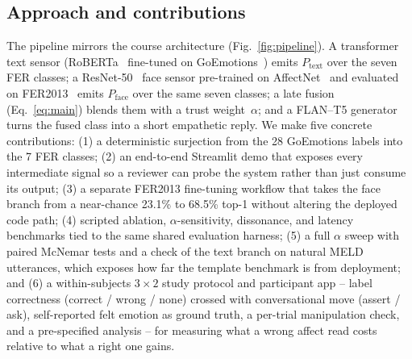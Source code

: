 \documentclass[sigconf,nonacm]{acmart}
\begin{document}
  \subsection{Approach and contributions}
  The pipeline mirrors the course architecture (Fig.~\ref{fig:pipeline}). A transformer text sensor (RoBERTa~\cite{liu2019roberta} fine-tuned on GoEmotions~\cite{demszky2020goemotions}) emits $P_\text{text}$ over the seven FER classes; a ResNet-50~\cite{he2016resnet} face sensor pre-trained on AffectNet~\cite{mollahosseini2019affectnet} and evaluated on FER2013~\cite{goodfellow2013challenges} emits $P_\text{face}$ over the same seven classes; a late fusion (Eq.~\ref{eq:main}) blends them with a trust weight~$\alpha$; and a FLAN--T5 generator~\cite{chung2024scaling} turns the fused class into a short empathetic reply. We make five concrete contributions: (1) a deterministic surjection from the 28 GoEmotions labels into the 7 FER classes; (2) an end-to-end Streamlit demo that exposes every intermediate signal so a reviewer can probe the system rather than just consume its output; (3) a separate FER2013 fine-tuning workflow that takes the face branch from a near-chance 23.1\% to 68.5\% top-1 without altering the deployed code path; (4) scripted ablation, $\alpha$-sensitivity, dissonance, and latency benchmarks tied to the same shared evaluation harness; (5) a full $\alpha$ sweep with paired McNemar tests and a check of the text branch on natural MELD utterances, which exposes how far the template benchmark is from deployment; and (6) a within-subjects $3\times2$ study protocol and participant app -- label correctness (correct / wrong / none) crossed with conversational move (assert / ask), self-reported felt emotion as ground truth, a per-trial manipulation check, and a pre-specified analysis -- for measuring what a wrong affect read costs relative to what a right one gains.
\end{document}
